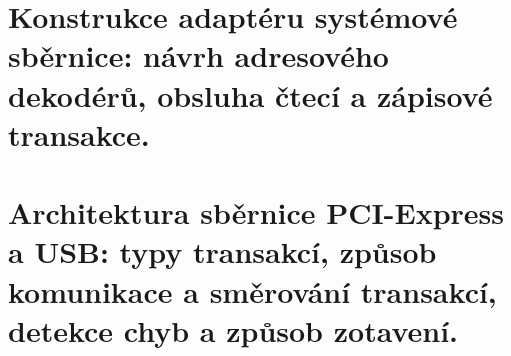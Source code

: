 \documentclass[a4paper, 11pt]{report}
\begin{document}
\chapter{Konstrukce adaptéru systémové sběrnice: návrh adresového dekodérů, obsluha čtecí a zápisové transakce.} \label{cha:62}
\chapter{Architektura sběrnice PCI-Express a USB: typy transakcí, způsob komunikace a směrování transakcí, detekce chyb a způsob zotavení.} \label{cha:63}

\end{document}
